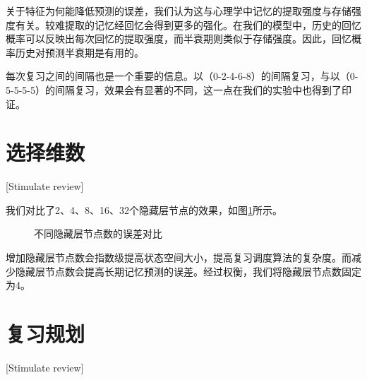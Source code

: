 关于特征为何能降低预测的误差，我们认为这与心理学中记忆的提取强度与存储强度有关。较难提取的记忆经回忆会得到更多的强化\cite{bjorkNewTheoryDisuse1992}。在我们的模型中，历史的回忆概率可以反映出每次回忆的提取强度，而半衰期则类似于存储强度。因此，回忆概率历史对预测半衰期是有用的。

每次复习之间的间隔也是一个重要的信息。以（0-2-4-6-8）的间隔复习，与以（0-5-5-5-5）的间隔复习，效果会有显著的不同\cite{maddoxRoleForgettingRate2011}，这一点在我们的实验中也得到了印证。

\section{选择维数}[Stimulate review]

我们对比了2、4、8、16、32个隐藏层节点的效果，如图\ref{fig:dimension}所示。

\begin{figure}[htbp]
    \centering
    \begin{minipage}{\textwidth}
    \centering
    \subfigure{\label{fig:dimension:train}}\addtocounter{subfigure}{-2}
    \hspace{2em}
    \subfigure{\label{fig:dimension:test}}\addtocounter{subfigure}{-2}
    \end{minipage}
    \centering
    \begin{minipage}{\textwidth}
    \centering
    \subfigure{\label{fig:dimension:smooth}}\addtocounter{subfigure}{-2}
    \hspace{2em}
    \subfigure{\label{fig:dimension:trand}}\addtocounter{subfigure}{-2}
    \end{minipage}
    \vspace{0.2em}
    \caption{不同隐藏层节点数的误差对比}
    \label{fig:dimension}
\end{figure}

增加隐藏层节点数会指数级提高状态空间大小，提高复习调度算法的复杂度。而减少隐藏层节点数会提高长期记忆预测的误差。经过权衡，我们将隐藏层节点数固定为4。

\section{复习规划}[Stimulate review]

